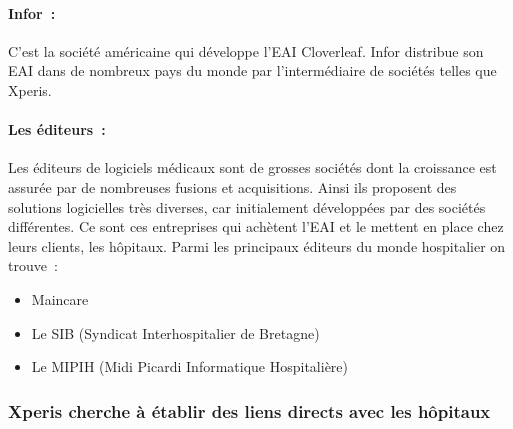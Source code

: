 			\paragraph{Infor~:}
			C'est la société américaine qui développe l'EAI Cloverleaf. Infor distribue
			son EAI dans de nombreux pays du monde par l'intermédiaire de sociétés
			telles que Xperis.
			
			\paragraph{Les éditeurs~:}
			Les éditeurs de logiciels médicaux sont de grosses sociétés dont la
			croissance est assurée par de nombreuses fusions et acquisitions. Ainsi ils
			proposent des solutions logicielles très diverses, car initialement
			développées par des sociétés différentes. Ce sont ces entreprises qui
			achètent l'EAI et le mettent en place chez leurs clients, les hôpitaux. Parmi
			les principaux éditeurs du monde hospitalier on trouve~:
			\begin{itemize}
				\item Maincare
				\item Le SIB (Syndicat Interhospitalier de Bretagne)
				\item Le MIPIH (Midi Picardi Informatique Hospitalière)
			\end{itemize}
			
		\subsubsection{Xperis cherche à établir des liens directs avec les hôpitaux}
